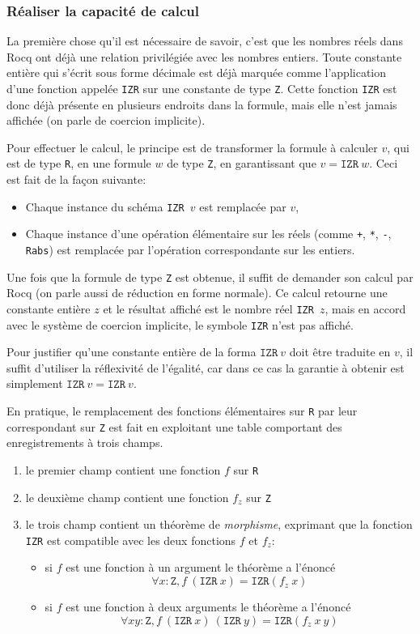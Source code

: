 \documentclass[draft]{jflart}
\begin{document}
\subsubsection{Réaliser la capacité de calcul}
La première chose qu'il est nécessaire de savoir, c'est que les
nombres réels dans Rocq ont déjà une relation privilégiée avec les
nombres entiers.  Toute constante entière qui s'écrit sous forme
décimale est déjà marquée comme l'application d'une fonction appelée
\texttt{IZR} sur une constante de type \texttt{Z}.  Cette fonction \texttt{IZR}
est donc déjà présente en plusieurs endroits dans la formule, mais
elle n'est jamais affichée (on parle de coercion implicite).

Pour effectuer le calcul, le principe est de transformer la formule à
calculer \(v\), qui est de type \texttt{R}, en une formule \(w\)
de type \texttt{Z}, en garantissant que \(v = \texttt{IZR}~w\).  Ceci est
fait de la façon suivante:
\begin{itemize}
\item Chaque instance du schéma \texttt{IZR \(v\)} est remplacée par \(v\),
\item Chaque instance d'une opération élémentaire sur les
réels (comme \texttt{+}, \texttt{*}, \texttt{-}, \texttt{Rabs}) est remplacée par
l'opération correspondante sur les entiers.
\end{itemize}
Une fois que la formule de type \texttt{Z} est obtenue, il suffit de demander
son calcul par Rocq (on parle aussi de réduction en forme normale).
Ce calcul retourne une constante entière \(z\) et le résultat
affiché est le nombre réel \texttt{IZR \(z\)}, mais en accord avec le
système de coercion implicite, le symbole \texttt{IZR} n'est pas affiché.

Pour justifier qu'une constante entière de la forma \(\texttt{IZR}~v\)
doit être traduite en \(v\), il suffit d'utiliser la réflexivité de
l'égalité, car dans ce cas la garantie à obtenir est simplement
\(\texttt{IZR}~v = \texttt{IZR}~v\).

En pratique, le remplacement des fonctions élémentaires sur \texttt{R} par
leur correspondant sur \texttt{Z} est fait en exploitant une table
comportant des enregistrements à trois champs.
\begin{enumerate}
\item le premier champ contient une fonction \(f\) sur \texttt{R}
\item le deuxième champ contient une fonction \(f_z\) sur \texttt{Z}
\item le trois champ contient un théorème de {\em morphisme},
  exprimant que la fonction \texttt{IZR} est compatible avec les deux
  fonctions \(f\) et \(f_z\):
\begin{itemize}
\item si \(f\) est une fonction à un argument le théorème a l'énoncé
\[\forall x : \texttt{Z}, f~(\texttt{IZR}~x)=\texttt{IZR}(f_z~x)\]
\item si \(f\) est une fonction à deux arguments le théorème a l'énoncé
\[\forall x y : \texttt{Z}, f~(\texttt{IZR}~x)~(\texttt{IZR}~y)=\texttt{IZR}(f_z~x~y)\]
\end{itemize}
\end{enumerate}
\end{document}

